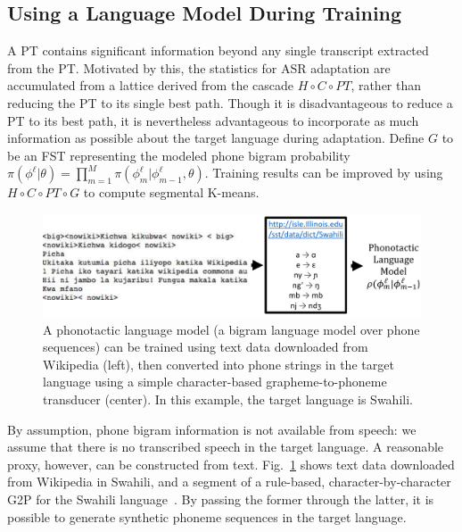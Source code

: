 \subsection{Using a Language Model During Training}
\label{sec:trainwithlm}

A PT contains significant information beyond any single
transcript extracted from the PT. Motivated by this, the statistics
for ASR adaptation are accumulated from a lattice derived from the
cascade $H\circ C \circ PT$, rather than reducing the PT to its single
best path. Though it is disadvantageous to reduce a PT to its best
path, it is nevertheless advantageous to incorporate as much
information as possible about the target language during adaptation.
Define $G$ to be an FST representing the modeled phone bigram
probability
$\pi(\phi^\ell|\theta)=\prod_{m=1}^M\pi(\phi_m^\ell|\phi_{m-1}^\ell,\theta)$.
Training results can be improved by using $H\circ C\circ PT\circ G$ to
compute segmental K-means.

\begin{figure}
  \centerline{\includegraphics[width=0.8\columnwidth]{../figs/fig_sloan.png}}
  \vspace*{-3mm}
  \caption{A phonotactic language model (a bigram language model over
    phone sequences) can be trained using text data downloaded from
    Wikipedia (left), then converted into phone strings in the target
    language using a simple character-based grapheme-to-phoneme
    transducer (center).  In this example, the target language is
    Swahili.}
  \label{fig:wikitext}
\end{figure}

By assumption, phone bigram information is not available from speech:
we assume that there is no transcribed speech in the target language.
A reasonable proxy, however, can be constructed from text.
Fig.~\ref{fig:wikitext} shows text data downloaded from Wikipedia in
Swahili, and a segment of a rule-based, character-by-character G2P for
the Swahili language~\cite{Hasegawajohnson15}.  By passing the former
through the latter, it is possible to generate synthetic phoneme
sequences in the target language.

